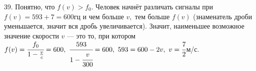 39. Понятно, что $f(v)>f_0.$ Человек начнёт различать сигналы при $f(v)=593+7=600$гц и чем больше $v,$ тем больше $f(v)$ (знаменатель дроби уменьшается, значит вся дробь увеличивается). Значит, наименьшее возможное значение скорости $v$ --- это то, при котором $f(v)=\cfrac{f_0}{1-\frac{v}{c}}=600,\
\cfrac{593}{1-\cfrac{v}{300}}=600,\ 593=600-2v,\ v=\cfrac{7}{2}$м/с.\\
